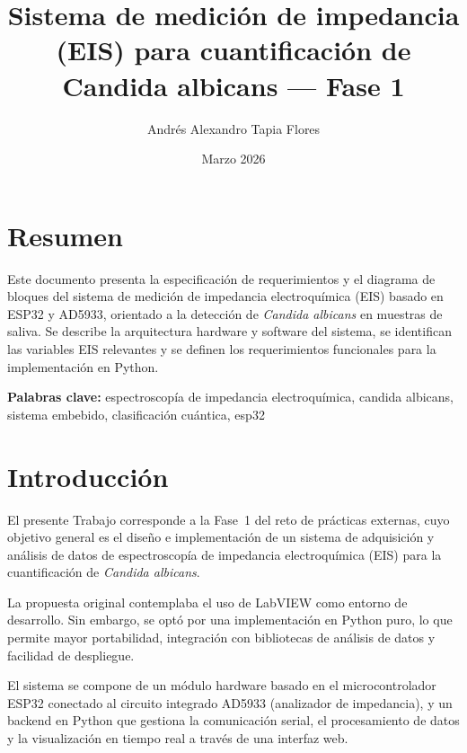 \documentclass[11pt,a4paper,spanish]{book}
\title{Sistema de medici\'{o}n de impedancia (EIS) para cuantificaci\'{o}n de Candida albicans --- Fase 1}
\author{Andr\'{e}s Alexandro Tapia Flores}
\date{Marzo 2026}
\begin{document}
\renewcommand{\listfigurename}{\'{I}ndice de figuras}
\renewcommand{\contentsname}{\'{I}ndice de contenidos}
\renewcommand{\figurename}{Figura}
\renewcommand{\tablename}{Tabla}

\maketitle
\frontmatter
\tableofcontents

\chapter{Resumen}
Este documento presenta la especificaci\'{o}n de requerimientos y el diagrama de bloques del sistema de medici\'{o}n de impedancia electroqu\'{i}mica (EIS) basado en ESP32 y AD5933, orientado a la detecci\'{o}n de \textit{Candida albicans} en muestras de saliva. Se describe la arquitectura hardware y software del sistema, se identifican las variables EIS relevantes y se definen los requerimientos funcionales para la implementaci\'{o}n en Python.

\vspace{0.5cm}
{\bf Palabras clave:} espectroscop\'{i}a de impedancia electroqu\'{i}mica, candida albicans, sistema embebido, clasificaci\'{o}n cu\'{a}ntica, esp32

\mainmatter

\chapter{Introducci\'{o}n}

El presente Trabajo corresponde a la Fase~1 del reto de pr\'{a}cticas externas, cuyo objetivo general es el dise\~{n}o e implementaci\'{o}n de un sistema de adquisici\'{o}n y an\'{a}lisis de datos de espectroscop\'{i}a de impedancia electroqu\'{i}mica (EIS) para la cuantificaci\'{o}n de \textit{Candida albicans}.

La propuesta original contemplaba el uso de LabVIEW como entorno de desarrollo. Sin embargo, se opt\'{o} por una implementaci\'{o}n en Python puro, lo que permite mayor portabilidad, integraci\'{o}n con bibliotecas de an\'{a}lisis de datos y facilidad de despliegue.

El sistema se compone de un m\'{o}dulo hardware basado en el microcontrolador ESP32 conectado al circuito integrado AD5933 (analizador de impedancia), y un backend en Python que gestiona la comunicaci\'{o}n serial, el procesamiento de datos y la visualizaci\'{o}n en tiempo real a trav\'{e}s de una interfaz web.
\end{document}
